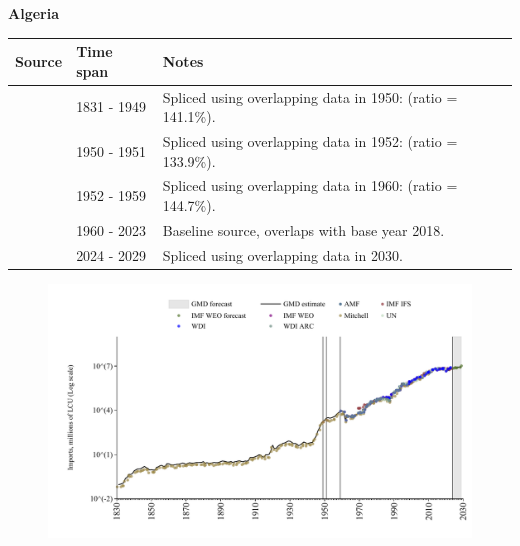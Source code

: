 \documentclass[12pt,a4paper,landscape]{article}
\begin{document}
\begin{adjustbox}{max totalsize={\paperwidth}{\paperheight},center}
\begin{minipage}[t][\textheight][t]{\textwidth}
\vspace*{0.5cm}
{}
\begin{center}
{\Large\bfseries Algeria}
\end{center}
\vspace{0.5cm}
\begin{table}[H]
\centering
\small
\begin{tabular}{|l|l|l|}
\hline
\textbf{Source} & \textbf{Time span} & \textbf{Notes} \\
\hline
\rowcolor{white}\cite{Mitchell}& 1831 - 1949 &Spliced using overlapping data in 1950: (ratio = 141.1\%).\\
\rowcolor{lightgray}\cite{IMF_IFS}& 1950 - 1951 &Spliced using overlapping data in 1952: (ratio = 133.9\%).\\
\rowcolor{white}\cite{Mitchell}& 1952 - 1959 &Spliced using overlapping data in 1960: (ratio = 144.7\%).\\
\rowcolor{lightgray}\cite{WDI}& 1960 - 2023 &Baseline source, overlaps with base year 2018.\\
\rowcolor{white}\cite{IMF_WEO_forecast}& 2024 - 2029 &Spliced using overlapping data in 2030.\\
\hline
\end{tabular}
\end{table}
\begin{figure}[H]
\centering
\includegraphics[width=\textwidth,height=0.6\textheight,keepaspectratio]{graphs/DZA_imports.pdf}
\end{figure}
\end{minipage}
\end{adjustbox}
\end{document}
